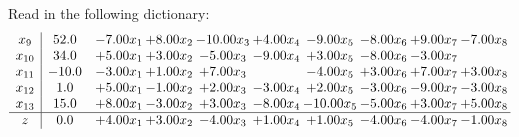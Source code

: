 \documentclass[9pt]{article}
\begin{document}
Read in the following dictionary:
\[\begin{array}{c| c c@{\hskip 2pt} c@{\hskip 2pt} c@{\hskip 2pt} c@{\hskip 2pt} c@{\hskip 2pt} c@{\hskip 2pt} c@{\hskip 2pt} c@{\hskip 2pt} }
 x_{9}   &  52.0 & -7.00 x_{1} & +  8.00 x_{2} & -10.00 x_{3} & +  4.00 x_{4} & -9.00 x_{5} & -8.00 x_{6} & +  9.00 x_{7} & -7.00 x_{8}\\
 x_{10}   &  34.0 & +  5.00 x_{1} & +  3.00 x_{2} & -5.00 x_{3} & -9.00 x_{4} & +  3.00 x_{5} & -8.00 x_{6} & -3.00 x_{7} &   \\
 x_{11}   &  -10.0 & -3.00 x_{1} & +  1.00 x_{2} & +  7.00 x_{3} &   & -4.00 x_{5} & +  3.00 x_{6} & +  7.00 x_{7} & +  3.00 x_{8}\\
 x_{12}   &  1.0 & +  5.00 x_{1} & -1.00 x_{2} & +  2.00 x_{3} & -3.00 x_{4} & +  2.00 x_{5} & -3.00 x_{6} & -9.00 x_{7} & -3.00 x_{8}\\
 x_{13}   &  15.0 & +  8.00 x_{1} & -3.00 x_{2} & +  3.00 x_{3} & -8.00 x_{4} & -10.00 x_{5} & -5.00 x_{6} & +  3.00 x_{7} & +  5.00 x_{8}\\
\hline
z    &  0.0 & +  4.00 x_{1} & +  3.00 x_{2} & -4.00 x_{3} & +  1.00 x_{4} & +  1.00 x_{5} & -4.00 x_{6} & -4.00 x_{7} & -1.00 x_{8}\\
\end{array}\]
\end{document}
